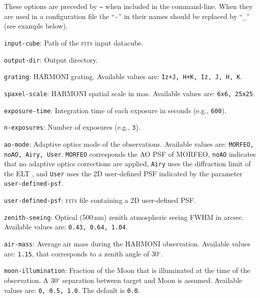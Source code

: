 \documentclass[12pt]{report}
\begin{document}
These options are preceded by \texttt{--} when included in the command-line. When they are used in a configuration file the ``\texttt{-}'' in their names should be replaced by ``\texttt{\_}'' (see example below).

\begin{description}
\item \texttt{input-cube}: Path of the \textsc{fits} input datacube.

\item \texttt{output-dir}: Output directory.

\item \texttt{grating}: HARMONI grating. Available values are: \texttt{Iz+J, H+K, Iz, J, H, K}.

\item \texttt{spaxel-scale}: HARMONI spatial scale in mas. Available values are: \texttt{6x6, 25x25}.

\item \texttt{exposure-time}: Integration time of each exposure in seconds (e.g., \texttt{600}).

\item \texttt{n-exposures}: Number of exposures (e.g., \texttt{3}).

\item \texttt{ao-mode}: Adaptive optics mode of the observations. Available values are: \texttt{MORFEO, noAO, Airy, User}. \texttt{MORFEO} corresponds the AO PSF of MORFEO, \texttt{noAO} indicates that no adaptive optics corrections are applied, \texttt{Airy} uses the diffraction limit of the ELT , and \texttt{User} uses the 2D user-defined PSF indicated by the parameter \texttt{user-defined-psf}.

\item \texttt{user-defined-psf}: \textsc{fits} file containing a 2D user-defined PSF.

\item \texttt{zenith-seeing}: Optical (500\,nm) zenith atmospheric seeing FWHM in arcsec. Available values are: \texttt{0.43, 0.64, 1.04}.

\item \texttt{air-mass}: Average air mass during the HARMONI observation. Available values are: \texttt{1.15}, that corresponds to a zenith angle of 30$^{\circ}$.

\item \texttt{moon-illumination}: Fraction of the Moon that is illuminated at the time of the observation. A 30$^{\circ}$ separation between target and Moon is assumed. Available values are: \texttt{0, 0.5, 1.0}. The default is \texttt{0.0}.


\end{description}
\end{document}
